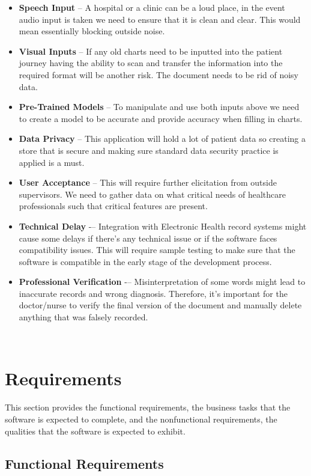 \documentclass[12pt]{article}
\begin{document}
\begin{itemize}
  \item \textbf{Speech Input} -- A hospital or a clinic can be a loud place, in the event audio input is taken we need to ensure that it is clean and clear. This would mean essentially blocking outside noise. 
  \item \textbf{Visual Inputs} -- If any old charts need to be inputted into the patient journey having the ability to scan and transfer the information into the required format will be another risk. The document needs to be rid of noisy data.
  \item \textbf{Pre-Trained Models} -- To manipulate and use both inputs above we need to create a model to be accurate and provide accuracy when filling in charts. 
  \item \textbf{Data Privacy} -- This application will hold a lot of patient data so creating a store that is secure and making sure standard data security practice is applied is a must.
  \item \textbf{User Acceptance} -- This will require further elicitation from outside supervisors. We need to gather data on what critical needs of healthcare professionals such that critical features are present.
  \item \textbf{Technical Delay} -– Integration with Electronic Health record systems might cause some delays if there’s any technical issue or if the software faces compatibility issues. This will require sample testing to make sure that the software is compatible in the early stage of the development process.
  \item \textbf{Professional Verification} -– Misinterpretation of some words might lead to inaccurate records and wrong diagnosis. Therefore, it’s important for the doctor/nurse to verify the final version of the document and manually delete anything that was falsely recorded. 
\end{itemize}

~\newpage

\section{Requirements}

This section provides the functional requirements, the business tasks that the
software is expected to complete, and the nonfunctional requirements, the
qualities that the software is expected to exhibit.

\subsection{Functional Requirements}
\end{document}
